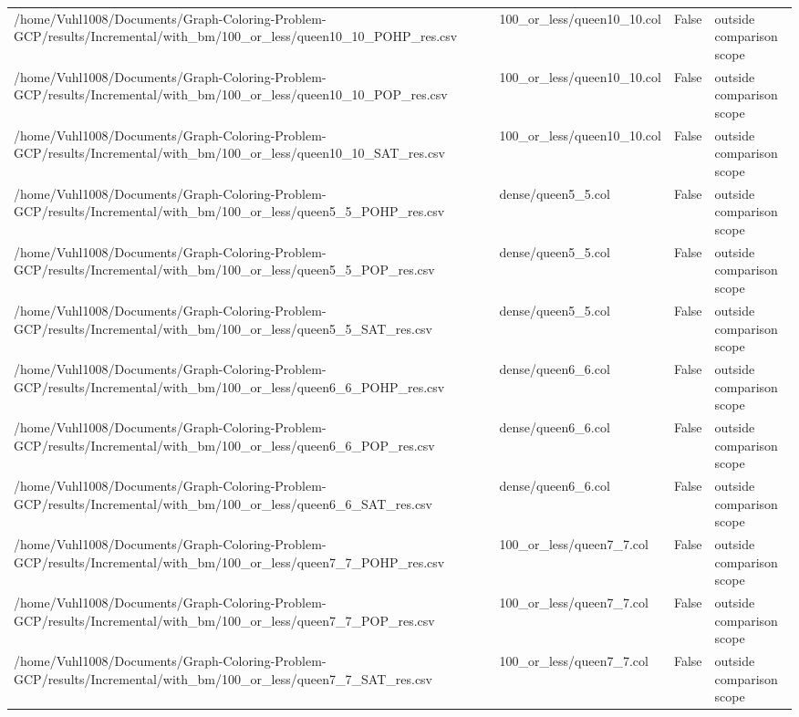 \begin{table}[htbp]
\begin{tabular}{llll}
/home/Vuhl1008/Documents/Graph-Coloring-Problem-GCP/results/Incremental/with\_bm/100\_or\_less/queen10\_10\_POHP\_res.csv & 100\_or\_less/queen10\_10.col & False & outside comparison scope \\
/home/Vuhl1008/Documents/Graph-Coloring-Problem-GCP/results/Incremental/with\_bm/100\_or\_less/queen10\_10\_POP\_res.csv & 100\_or\_less/queen10\_10.col & False & outside comparison scope \\
/home/Vuhl1008/Documents/Graph-Coloring-Problem-GCP/results/Incremental/with\_bm/100\_or\_less/queen10\_10\_SAT\_res.csv & 100\_or\_less/queen10\_10.col & False & outside comparison scope \\
/home/Vuhl1008/Documents/Graph-Coloring-Problem-GCP/results/Incremental/with\_bm/100\_or\_less/queen5\_5\_POHP\_res.csv & dense/queen5\_5.col & False & outside comparison scope \\
/home/Vuhl1008/Documents/Graph-Coloring-Problem-GCP/results/Incremental/with\_bm/100\_or\_less/queen5\_5\_POP\_res.csv & dense/queen5\_5.col & False & outside comparison scope \\
/home/Vuhl1008/Documents/Graph-Coloring-Problem-GCP/results/Incremental/with\_bm/100\_or\_less/queen5\_5\_SAT\_res.csv & dense/queen5\_5.col & False & outside comparison scope \\
/home/Vuhl1008/Documents/Graph-Coloring-Problem-GCP/results/Incremental/with\_bm/100\_or\_less/queen6\_6\_POHP\_res.csv & dense/queen6\_6.col & False & outside comparison scope \\
/home/Vuhl1008/Documents/Graph-Coloring-Problem-GCP/results/Incremental/with\_bm/100\_or\_less/queen6\_6\_POP\_res.csv & dense/queen6\_6.col & False & outside comparison scope \\
/home/Vuhl1008/Documents/Graph-Coloring-Problem-GCP/results/Incremental/with\_bm/100\_or\_less/queen6\_6\_SAT\_res.csv & dense/queen6\_6.col & False & outside comparison scope \\
/home/Vuhl1008/Documents/Graph-Coloring-Problem-GCP/results/Incremental/with\_bm/100\_or\_less/queen7\_7\_POHP\_res.csv & 100\_or\_less/queen7\_7.col & False & outside comparison scope \\
/home/Vuhl1008/Documents/Graph-Coloring-Problem-GCP/results/Incremental/with\_bm/100\_or\_less/queen7\_7\_POP\_res.csv & 100\_or\_less/queen7\_7.col & False & outside comparison scope \\
/home/Vuhl1008/Documents/Graph-Coloring-Problem-GCP/results/Incremental/with\_bm/100\_or\_less/queen7\_7\_SAT\_res.csv & 100\_or\_less/queen7\_7.col & False & outside comparison scope \\

\end{tabular}
\end{table}
